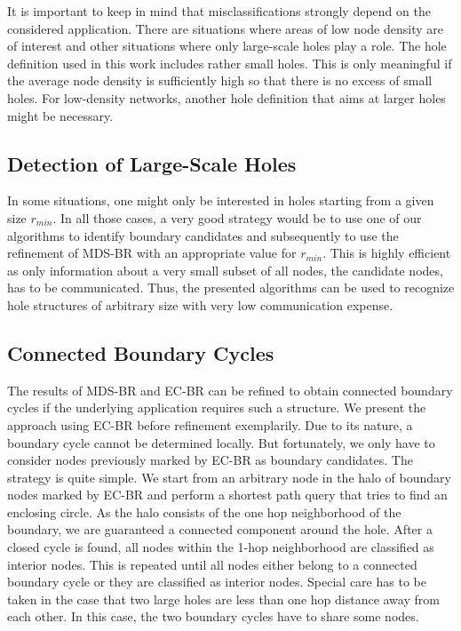 \documentclass{llncs}
\begin{document}
It is important to keep in mind that misclassifications strongly depend on the considered application. There are situations where areas of low node density are of interest and other situations where only large-scale holes play a role. The hole definition used in this work includes rather small holes. This is only meaningful if the average node density is sufficiently high so that there is no excess of small holes. For low-density networks, another hole definition that aims at larger holes might be necessary. 

\subsection{Detection of Large-Scale Holes}
In some situations, one might only be interested in holes starting from a given size $r_{min}$.
In all those cases, a very good strategy would be to use one of our algorithms to identify boundary candidates and subsequently to use the refinement of MDS-BR with an appropriate value for $r_{min}$.
This is highly efficient as only information about a very small subset of all nodes, the candidate nodes, has to be communicated.
Thus, the presented algorithms can be used to recognize hole structures of arbitrary size with very low communication expense.

\subsection{Connected Boundary Cycles}
The results of MDS-BR and EC-BR can be refined to obtain connected boundary cycles if the underlying application requires such a structure.
We present the approach using EC-BR before refinement exemplarily.
Due to its nature, a boundary cycle cannot be determined locally. 
But fortunately, we only have to consider nodes previously marked by EC-BR as boundary candidates.
The strategy is quite simple.
We start from an arbitrary node in the halo of boundary nodes marked by EC-BR and perform a shortest path query that tries to find an enclosing circle.
As the halo consists of the one hop neighborhood of the boundary, we are guaranteed a connected component around the hole.
After a closed cycle is found, all nodes within the 1-hop neighborhood are classified as interior nodes.
This is repeated until all nodes either belong to a connected boundary cycle or they are classified as interior nodes.
Special care has to be taken in the case that two large holes are less than one hop distance away from each other.
In this case, the two boundary cycles have to share some nodes.
\end{document}
